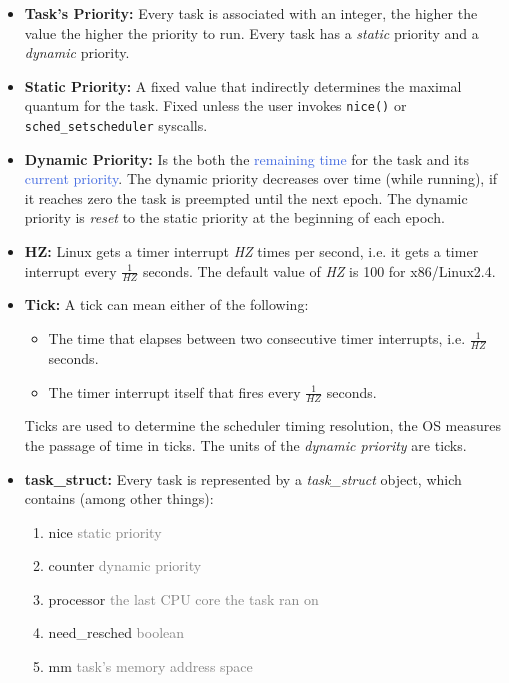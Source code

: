 \documentclass[openany,12pt]{book}
\newcommand{\code}[1]{\texttt{#1}}
\newcommand{\blue}[1]{\textcolor{RoyalBlue}{#1}}
\newcommand{\gray}[1]{\textcolor{gray}{#1}}
\begin{document}
\begin{itemize}
  \item \textbf{Task's Priority:} Every task is associated with an integer, the higher the value the higher the priority to run. Every task has a \textit{static} priority and a \textit{dynamic} priority.
  \item \textbf{Static Priority:} A fixed value that indirectly determines the maximal quantum for the task. Fixed unless the user invokes \code{nice()} or \code{sched\_setscheduler} syscalls.
  \item \textbf{Dynamic Priority:} Is the both the \blue{remaining time} for the task and its \blue{current priority}. The dynamic priority decreases over time (while running), if it reaches zero the task is preempted until the next epoch. The dynamic priority is \textit{reset} to the static priority at the beginning of each epoch.

  \item \textbf{HZ:} Linux gets a timer interrupt \textit{HZ} times per second, i.e. it gets a timer interrupt every \(\frac{1}{\textit{HZ}}\) seconds. The default value of \textit{HZ} is 100 for x86/Linux2.4.

  \item \textbf{Tick:} A tick can mean either of the following:
        \begin{itemize}
          \item The time that elapses between two consecutive timer interrupts, i.e. \(\frac{1}{\textit{HZ}}\) seconds.
          \item The timer interrupt itself that fires every \(\frac{1}{\textit{HZ}}\) seconds.
        \end{itemize}
        Ticks are used to determine the scheduler timing resolution, the OS measures the passage of time in ticks. The units of the \textit{dynamic priority} are ticks.

  \item \textbf{task\_struct:} Every task is represented by a \textit{task\_struct} object, which contains (among other things):
        \begin{enumerate}
          \item nice \gray{static priority}
          \item counter \gray{dynamic priority}
          \item processor \gray{the last CPU core the task ran on}
          \item need\_resched \gray{boolean}
          \item mm \gray{task's memory address space}
        \end{enumerate}


\end{itemize}
\end{document}
